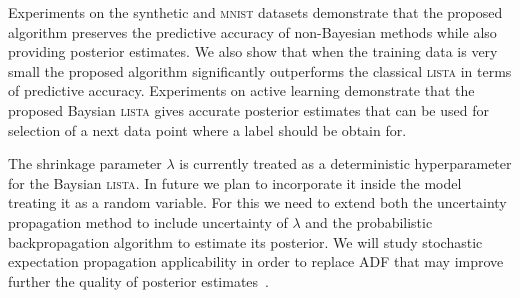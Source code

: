 \documentclass[letterpaper]{article}
\begin{document}
Experiments on the synthetic and \textsc{mnist} datasets demonstrate that the proposed algorithm preserves the predictive accuracy of non-Bayesian methods while also providing posterior estimates. We also show that when the training data is very small the proposed algorithm significantly outperforms the classical \textsc{lista} in terms of predictive accuracy. Experiments on active learning demonstrate that the proposed Baysian \textsc{lista} gives accurate posterior estimates that can be used for selection of a next data point where a label should be obtain for. 

The shrinkage parameter $\lambda$ is currently treated as a deterministic hyperparameter for the Baysian \textsc{lista}. In future we plan to incorporate it inside the model treating it as a random variable. For this we need to extend both the uncertainty propagation method to include uncertainty of $\lambda$ and the probabilistic backpropagation algorithm to estimate its posterior. We will study stochastic expectation propagation applicability in order to replace ADF that may improve further the quality of posterior estimates~\citep{li2015stochastic}.    


\end{document}
